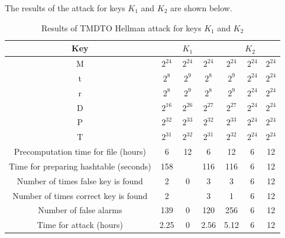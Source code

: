 The results of the attack for keys $K_1$ and $K_2$ are shown below. 

\begin{table}[ht!]
\begin{center}
\begin{tabular}{|c||c|c|c||c|c|c|}
\hline
Key & \multicolumn{3}{c||}{\textbf{$K_1$}} & \multicolumn{3}{c|}{\textbf{$K_2$}} \\ \hline \hline
M																				&	$2^{24}$ 	&	$2^{24}$ 	&	$2^{24}$ 	&	$2^{24}$ 	&	$2^{24}$ 	&	$2^{24}$ 	\\ 
t	  																		&	$2^{8}$ 	&	$2^{9}$ 	&	$2^{8}$ 	&	$2^{9}$		&	$2^{24}$ 	&	$2^{24}$ 	\\ 
r	  																		&	$2^{8}$ 	&	$2^{9}$ 	&	$2^{8}$ 	&	$2^{9}$		&	$2^{24}$ 	&	$2^{24}$ 	\\ 
D	  																		&	$2^{16}$ 	&	$2^{26}$ 	&	$2^{27}$ 	&	$2^{27}$	&	$2^{24}$ 	&	$2^{24}$ 	\\ \hline \hline
P	  																		&	$2^{32}$ 	&	$2^{33}$ 	&	$2^{32}$ 	&	$2^{33}$	&	$2^{24}$ 	&	$2^{24}$ 	\\ \hline
T	  																		&	$2^{31}$ 	&	$2^{32}$ 	&	$2^{31}$ 	&	$2^{32}$	&	$2^{24}$ 	&	$2^{24}$ 	\\ \hline
Precomputation time for file (hours)		&	6 	 			&	12 				&	6					&	12 				&	6					&	12				\\ \hline
Time for preparing hashtable (seconds)	&	158				&	 					& 116				&	116				&	6					&	12				\\ \hline
Number of times false key is found			&	2 				&	0 				&	3 				&	3 				&	6					&	12				\\ \hline
Number of times correct key is found 		&	2 				&	 					&	3 				&	1 				&	6					&	12				\\ \hline
Number of false alarms									&	139				&	0 				&	120				&	256				&	6					&	12				\\ \hline
Time for attack	(hours)									&	2.25 			&	0 				&	2.56 		 	&	5.12 			&	6					&	12				\\ \hline
\end{tabular}
\end{center}
\caption{Results of TMDTO Hellman attack for keys $K_1$ and $K_2$}
\label{tab:hellman-attack-results}
\end{table}

